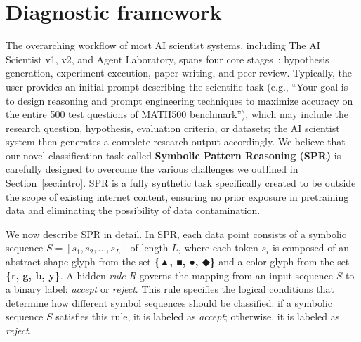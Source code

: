 \documentclass[10pt]{article}
\begin{document}
\section{Diagnostic framework}
\label{sec:framwork}

The overarching workflow of most AI scientist systems, including The AI Scientist v1, v2, and Agent Laboratory, spans four core stages~\citep{luo2025llm4sr}: hypothesis generation, experiment execution, paper writing, and peer review. Typically, the user provides an initial prompt describing the scientific task (e.g., ``Your goal is to design reasoning and prompt engineering techniques to maximize accuracy on the entire 500 test questions of MATH500 benchmark''), which may include the research question, hypothesis, evaluation criteria, or datasets; the AI scientist system then generates a complete research output accordingly.
We believe that our novel classification task called \textbf{Symbolic Pattern Reasoning (SPR)} is carefully designed to overcome the various challenges we outlined in Section~\ref{sec:intro}. SPR is a fully synthetic task specifically created to be outside the scope of existing internet content, ensuring no prior exposure in pretraining data and eliminating the possibility of data contamination.

We now describe SPR in detail. In SPR, each data point consists of a symbolic sequence $S = [s_1, s_2, \dots, s_L]$ of length $L$, where each token $s_i$ is composed of an abstract shape glyph from the set \textbf{\{▲, ■, ●, ◆\}} and a color glyph from the set \textbf{\{r, g, b, y\}}. A hidden \textit{rule} $R$ governs the mapping from an input sequence $S$ to a binary label: \textit{accept} or \textit{reject}. 
This rule specifies the logical conditions that determine how different symbol sequences should be classified: if a symbolic sequence $S$ satisfies this rule, it is labeled as \textit{accept}; otherwise, it is labeled as \textit{reject}.
\end{document}
